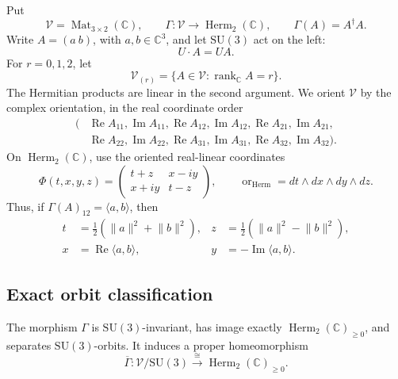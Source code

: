 Put
\begin{equation}
 \mathscr V=\operatorname{Mat}_{3\times2}(\mathbb C),
 \qquad
 \Gamma:\mathscr V\longrightarrow\operatorname{Herm}_2(\mathbb C),
 \qquad
 \Gamma(A)=A^\dagger A.
 \label{eq:hrgc-gram-map}
\end{equation}
Write \(A=(a\ b)\), with \(a,b\in\mathbb C^3\), and let
\(\mathrm{SU}(3)\) act on the left:
\[
 U\cdot A=UA.
\]
For \(r=0,1,2\), let
\[
 \mathscr V_{(r)}=\{A\in\mathscr V:\operatorname{rank}_{\mathbb C}A=r\}.
\]
The Hermitian products are linear in the second argument.  We orient
\(\mathscr V\) by the complex orientation, in the real coordinate order
\begin{equation}
 \begin{split}
 (&\operatorname{Re}A_{11},\operatorname{Im}A_{11},
   \operatorname{Re}A_{12},\operatorname{Im}A_{12},
   \operatorname{Re}A_{21},\operatorname{Im}A_{21},\\
  &\operatorname{Re}A_{22},\operatorname{Im}A_{22},
   \operatorname{Re}A_{31},\operatorname{Im}A_{31},
   \operatorname{Re}A_{32},\operatorname{Im}A_{32}).
 \end{split}
 \label{eq:hrgc-v-orientation}
\end{equation}
On \(\operatorname{Herm}_2(\mathbb C)\), use the oriented real-linear
coordinates
\begin{equation}
 \Phi(t,x,y,z)=
 \begin{pmatrix}
  t+z&x-iy\\
  x+iy&t-z
 \end{pmatrix},
 \qquad
 \operatorname{or}_{\operatorname{Herm}}=dt\wedge dx\wedge dy\wedge dz.
 \label{eq:hrgc-pauli-coordinates}
\end{equation}
Thus, if \(\Gamma(A)_{12}=\langle a,b\rangle\), then
\begin{equation}
 \begin{aligned}
 t&=\frac12(\lVert a\rVert^2+\lVert b\rVert^2),&
 z&=\frac12(\lVert a\rVert^2-\lVert b\rVert^2),\\
 x&=\operatorname{Re}\langle a,b\rangle,&
 y&=-\operatorname{Im}\langle a,b\rangle.
 \end{aligned}
 \label{eq:hrgc-column-pauli-coordinates}
\end{equation}

\subsection{Exact orbit classification}

\begin{theorem}
\label{thm:hrgc-gram-quotient}
The morphism \(\Gamma\) is \(\mathrm{SU}(3)\)-invariant, has image exactly
\(\operatorname{Herm}_2(\mathbb C)_{\geq0}\), and separates
\(\mathrm{SU}(3)\)-orbits.  It induces a proper homeomorphism
\begin{equation}
 \overline\Gamma:
 \mathscr V/\mathrm{SU}(3)
 \xrightarrow{\ \cong\ }
 \operatorname{Herm}_2(\mathbb C)_{\geq0}.
 \label{eq:hrgc-orbit-homeomorphism}
\end{equation}
\end{theorem}

